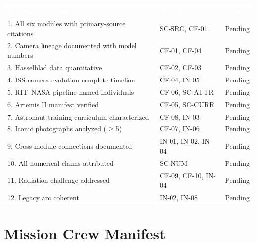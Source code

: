 \documentclass[11pt,letterpaper]{article}
\newcommand{\tableheader}[1]{\textbf{\sffamily\textcolor{white}{#1}}}
\begin{document}
\begin{center}
\begin{tabularx}{\textwidth}{XL{4cm}C{2cm}}
\toprule
{}
\tableheader{Success Criterion} & \tableheader{Test ID(s)} & \tableheader{Status} \\
. All six modules with primary-source citations & SC-SRC, CF-01 & Pending \\
2. Camera lineage documented with model numbers & CF-01, CF-04 & Pending \\
3. Hasselblad data quantitative & CF-02, CF-03 & Pending \\
4. ISS camera evolution complete timeline & CF-04, IN-05 & Pending \\
5. RIT--NASA pipeline named individuals & CF-06, SC-ATTR & Pending \\
6. Artemis II manifest verified & CF-05, SC-CURR & Pending \\
7. Astronaut training curriculum characterized & CF-08, IN-03 & Pending \\
8. Iconic photographs analyzed ($\geq$5) & CF-07, IN-06 & Pending \\
9. Cross-module connections documented & IN-01, IN-02, IN-04 & Pending \\
10. All numerical claims attributed & SC-NUM & Pending \\
11. Radiation challenge addressed & CF-09, CF-10, IN-04 & Pending \\
12. Legacy arc coherent & IN-02, IN-08 & Pending \\
\bottomrule
\end{tabularx}
\end{center}

\section{Mission Crew Manifest}
\end{document}
